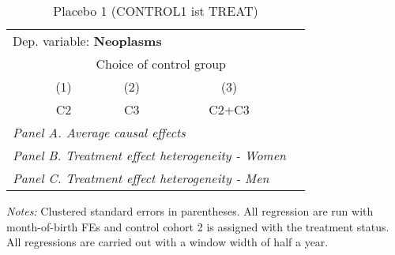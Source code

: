  \begin{table}[H] \centering \begin{threeparttable} \caption{Placebo 1 (CONTROL1 ist TREAT) } {\def\sym#1{\ifmmode^{#1}\else\(^{#1}\)\fi} \begin{tabular}{l*{4}{c}} \toprule \multicolumn{4}{l}{Dep. variable: \textbf{Neoplasms}} \\ & \multicolumn{3}{c}{Choice of control group} \\ \cmidrule(lr){2-4}
            &\multicolumn{1}{c}{(1)}&\multicolumn{1}{c}{(2)}&\multicolumn{1}{c}{(3)}\\
            &\multicolumn{1}{c}{C2}&\multicolumn{1}{c}{C3}&\multicolumn{1}{c}{C2+C3}\\
\midrule
 \multicolumn{4}{l}{\emph{Panel A. Average causal effects}} \\      \midrule\multicolumn{4}{l}{\emph{Panel B. Treatment effect heterogeneity - Women}} \\      \midrule\multicolumn{4}{l}{\emph{Panel C. Treatment effect heterogeneity - Men}} \\      
\bottomrule \end{tabular} } \begin{tablenotes} \item \scriptsize \emph{Notes:} Clustered standard errors in parentheses. All regression are run with month-of-birth FEs and control cohort 2 is assigned with the treatment status. All regressions are carried out with a window width of half a year. \end{tablenotes} \end{threeparttable} \end{table} 
